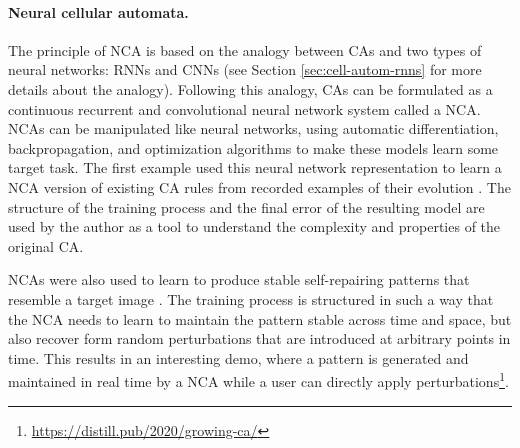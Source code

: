 \paragraph{Neural cellular automata\label{sec:neur-cell-autom}.}
The principle of \ac{NCA} is based on the analogy between \acp{CA} and two types
of neural networks: \acp{RNN} and \acp{CNN} (see Section
\ref{sec:cell-autom-rnns} for more details about the analogy). Following this
analogy, \acp{CA} can be formulated as a continuous recurrent and convolutional
neural network system called a \acf{NCA}. \acp{NCA} can be manipulated like
neural networks, using automatic differentiation, backpropagation, and
optimization algorithms to make these models learn some target task. The first
example used this neural network representation to learn a \ac{NCA} version of
existing \ac{CA} rules from recorded examples of their evolution
\parencite{gilpinCellularAutomataConvolutional2018}. The structure of the
training process and the final error of the resulting model are used by the author as
a tool to understand the complexity and properties of the original \ac{CA}.

\acp{NCA} were also used to learn to produce stable self-repairing patterns that
resemble a target image \parencite{mordvintsevGrowingNeuralCellular2020}. The
training process is structured in such a way that the \ac{NCA} needs to learn to
maintain the pattern stable across time and space, but also recover form random
perturbations that are introduced at arbitrary points in time. This results in
an interesting demo, where a pattern is generated and maintained in real time by
a \ac{NCA} while a user can directly apply
perturbations\footnote{\url{https://distill.pub/2020/growing-ca/}}.

